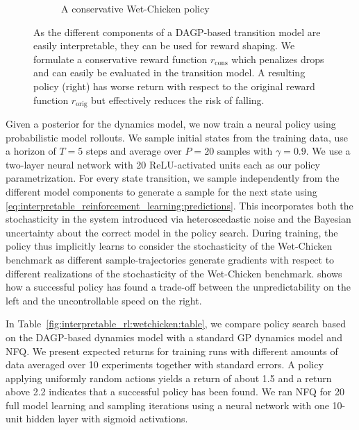 \begin{figure}[tp]
\begin{subfigure}[b]{\linewidth}
        \caption{
            \label{fig:interpretable_rl:wetchicken:conservative_policy}
            A conservative Wet-Chicken policy
        }
    \end{subfigure}
    \caption{
        \label{fig:interpretable_rl:conservative_wetchicken_policy}
        As the different components of a DAGP-based transition model are easily interpretable, they can be used for reward shaping.
        We formulate a conservative reward function $r_\text{cons}$ which penalizes drops and can easily be evaluated in the transition model.
        A resulting policy (right) has worse return with respect to the original reward function $r_\text{orig}$ but effectively reduces the risk of falling.
    }
\end{figure}
Given a posterior for the dynamics model, we now train a neural policy using probabilistic model rollouts.
We sample initial states from the training data, use a horizon of $T = 5$ steps and average over $P = 20$ samples with $\gamma = 0.9$.
We use a two-layer neural network with 20 ReLU-activated units each as our policy parametrization.
For every state transition, we sample independently from the different model components to generate a sample for the next state using \cref{eq:interpretable_reinforcement_learning:predictions}.
This incorporates both the stochasticity in the system introduced via heteroscedastic noise and the Bayesian uncertainty about the correct model in the policy search.
During training, the policy thus implicitly learns to consider the stochasticity of the Wet-Chicken benchmark as different sample-trajectories generate gradients with respect to different realizations of the stochasticity of the Wet-Chicken benchmark.
 shows how a successful policy has found a trade-off between the unpredictability on the left and the uncontrollable speed on the right.

In Table~\ref{fig:interpretable_rl:wetchicken:table}, we compare policy search based on the DAGP-based dynamics model with a standard GP dynamics model and NFQ.
We present expected returns for training runs with different amounts of data averaged over 10 experiments together with standard errors.
A policy applying uniformly random actions yields a return of about \num{1.5} and a return above \num{2.2} indicates that a successful policy has been found.
We ran NFQ for 20 full model learning and sampling iterations using a neural network with one 10-unit hidden layer with sigmoid activations.


